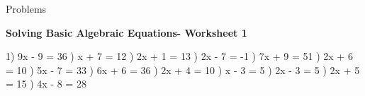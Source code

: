 \documentclass{article}%
\begin{document}
%
\huge%
\vspace*{\fill}%
\begin{center}%
Problems%
\end{center}%
\vspace*{\fill}%
\pagebreak%
\normalsize%
\large%
\begin{center}%
\textbf{Solving Basic Algebraic Equations- Worksheet 1}%
\newline%
\newline%
\newline%
\end{center} \normalsize%
1) 9x - 9 = 36%
\newline%
\newline%
) x + 7 = 12%
\newline%
\newline%
) 2x + 1 = 13%
\newline%
\newline%
) 2x - 7 = -1%
\newline%
\newline%
) 7x + 9 = 51%
\newline%
\newline%
) 2x + 6 = 10%
\newline%
\newline%
) 5x - 7 = 33%
\newline%
\newline%
) 6x + 6 = 36%
\newline%
\newline%
) 2x + 4 = 10%
\newline%
\newline%
) x - 3 = 5%
\newline%
\newline%
) 2x - 3 = 5%
\newline%
\newline%
) 2x + 5 = 15%
\newline%
\newline%
) 4x - 8 = 28%
\end{document}
